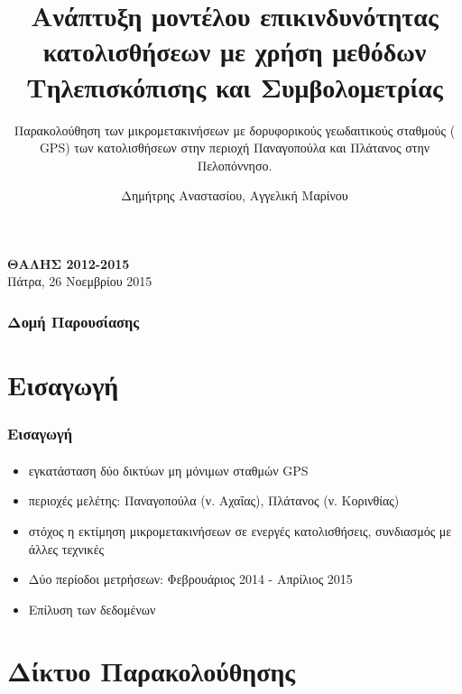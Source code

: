 \documentclass{beamer}
\title{Ανάπτυξη μοντέλου επικινδυνότητας κατολισθήσεων με χρήση μεθόδων Τηλεπισκόπισης και Συμβολομετρίας}
\subtitle{Παρακολούθηση των μικρομετακινήσεων  με δορυφορικούς  γεωδαιτικούς σταθμούς ( GPS)  των κατολισθήσεων στην περιοχή Παναγοπούλα και Πλάτανος στην Πελοπόννησο.}
\date{}
\author{Δημήτρης Αναστασίου, Αγγελική Μαρίνου}
\institute{Εθνικό Μετσόβιο Πολυτεχνείο\\Κέντρο Δορυφόρων Διονύσου\\\url{http://dionysos.survey.ntua.gr}}
\begin{document}

\begin{frame}[plain]
\maketitle
\begin{block}{}
    \begin{center}
      \textbf{ΘΑΛΗΣ 2012-2015}\\
    Πάτρα, 26 Νοεμβρίου 2015 \\
    \end{center}
\end{block}
\end{frame}

\begin{frame}
    \frametitle{Δομή Παρουσίασης}
    \tableofcontents
\end{frame}

\section{Εισαγωγή}

\begin{frame}\frametitle{Εισαγωγή}\framesubtitle{}
\begin{itemize}
	\item εγκατάσταση δύο δικτύων μη μόνιμων σταθμών GPS 
	\item περιοχές μελέτης: Παναγοπούλα (ν. Αχαΐας), Πλάτανος (ν. Κορινθίας)
	\item στόχος η εκτίμηση μικρομετακινήσεων σε ενεργές κατολισθήσεις, συνδιασμός με άλλες τεχνικές
	\item Δύο περίοδοι μετρήσεων: Φεβρουάριος 2014 - Απρίλιος 2015
	\item Επίλυση των δεδομένων
\end{itemize}

\end{frame}


\section{Δίκτυο Παρακολούθησης}
\end{document}
